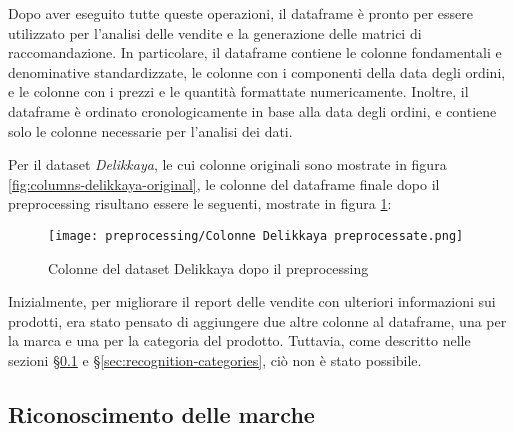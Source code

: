 Dopo aver eseguito tutte queste operazioni, il dataframe è pronto per essere utilizzato per l'analisi delle vendite e la generazione delle matrici di raccomandazione. In particolare, il dataframe contiene le colonne fondamentali e denominative standardizzate, le colonne con i componenti della data degli ordini, e le colonne con i prezzi e le quantità formattate numericamente. Inoltre, il dataframe è ordinato cronologicamente in base alla data degli ordini, e contiene solo le colonne necessarie per l'analisi dei dati.

Per il dataset \emph{Delikkaya}, le cui colonne originali sono mostrate in figura \ref{fig:columns-delikkaya-original}, le colonne del dataframe finale dopo il preprocessing risultano essere le seguenti, mostrate in figura \ref{fig:columns-delikkaya-final}:
\begin{figure}[h]
    \centering
    \texttt{[image: preprocessing/Colonne Delikkaya preprocessate.png]}
    \caption{Colonne del dataset Delikkaya dopo il preprocessing}
    \label{fig:columns-delikkaya-final}
\end{figure}

Inizialmente, per migliorare il report delle vendite con ulteriori informazioni sui prodotti, era stato pensato di aggiungere due altre colonne al dataframe, una per la marca e una per la categoria del prodotto. Tuttavia, come descritto nelle sezioni \S\ref{sec:recognition-brands} e \S\ref{sec:recognition-categories}, ciò non è stato possibile.


\subsection{Riconoscimento delle marche}
\label{sec:recognition-brands}

